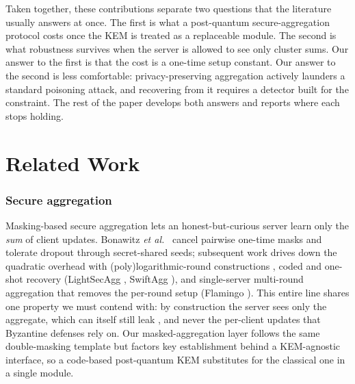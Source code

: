 \documentclass[lettersize,journal]{IEEEtran}
\begin{document}
Taken together, these contributions separate two questions that the literature
usually answers at once. The first is what a post-quantum secure-aggregation
protocol costs once the KEM is treated as a replaceable module. The second is what
robustness survives when the server is allowed to see only cluster sums. Our answer
to the first is that the cost is a one-time setup constant. Our answer to the second
is less comfortable: privacy-preserving aggregation actively launders a standard
poisoning attack, and recovering from it requires a detector built for the
constraint. The rest
of the paper develops both answers and reports where each stops holding.

\section{Related Work}
\subsubsection{Secure aggregation} Masking-based secure aggregation lets an
honest-but-curious server learn only the \emph{sum} of client updates. Bonawitz
\emph{et al.}\ \cite{bonawitz2017} cancel pairwise one-time masks and tolerate dropout
through secret-shared seeds; subsequent work drives down the quadratic overhead with
(poly)logarithmic-round constructions \cite{bell2020}, coded and one-shot recovery
(LightSecAgg \cite{lightsecagg}, SwiftAgg \cite{swiftagg}), and single-server
multi-round aggregation that removes the per-round setup (Flamingo \cite{flamingo}).
This entire line shares one property we must contend with: by construction the server
sees only the aggregate, which can itself still leak \cite{elkordy2022}, and never
the per-client updates that Byzantine defenses rely on. Our masked-aggregation layer
follows the same double-masking template but factors key establishment behind a
KEM-agnostic interface, so a code-based post-quantum KEM substitutes for the classical
one in a single module.
\end{document}
